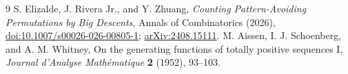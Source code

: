 \documentclass[11pt,a4paper]{article}
\begin{document}
\begin{thebibliography}{9}
 S. Elizalde, J. Rivera Jr., and Y. Zhuang,
\emph{Counting Pattern-Avoiding Permutations by Big Descents},
Annals of Combinatorics (2026),
\href{https://doi.org/10.1007/s00026-026-00805-1}{doi:10.1007/s00026-026-00805-1};
\href{https://arxiv.org/abs/2408.15111}{arXiv:2408.15111}.
 M. Aissen, I. J. Schoenberg, and A. M. Whitney,
On the generating functions of totally positive sequences I,
\emph{Journal d'Analyse Math\'ematique} \textbf{2} (1952), 93--103.
\end{thebibliography}
\end{document}
